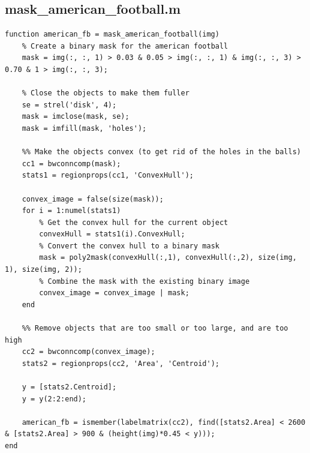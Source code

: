 \documentclass[conference]{IEEEtran}
\begin{document}
        \subsection{mask\_american\_football.m}
            \begin{lstlisting}[style=Matlab-editor, basicstyle=\scriptsize]
function american_fb = mask_american_football(img)
    % Create a binary mask for the american football
    mask = img(:, :, 1) > 0.03 & 0.05 > img(:, :, 1) & img(:, :, 3) > 0.70 & 1 > img(:, :, 3);

    % Close the objects to make them fuller
    se = strel('disk', 4);
    mask = imclose(mask, se);
    mask = imfill(mask, 'holes');

    %% Make the objects convex (to get rid of the holes in the balls)
    cc1 = bwconncomp(mask);
    stats1 = regionprops(cc1, 'ConvexHull');

    convex_image = false(size(mask));
    for i = 1:numel(stats1)
        % Get the convex hull for the current object
        convexHull = stats1(i).ConvexHull;     
        % Convert the convex hull to a binary mask
        mask = poly2mask(convexHull(:,1), convexHull(:,2), size(img, 1), size(img, 2));
        % Combine the mask with the existing binary image
        convex_image = convex_image | mask;
    end

    %% Remove objects that are too small or too large, and are too high
    cc2 = bwconncomp(convex_image);
    stats2 = regionprops(cc2, 'Area', 'Centroid');

    y = [stats2.Centroid];
    y = y(2:2:end);

    american_fb = ismember(labelmatrix(cc2), find([stats2.Area] < 2600 & [stats2.Area] > 900 & (height(img)*0.45 < y)));
end
            \end{lstlisting}
\end{document}
